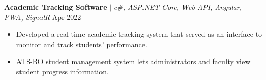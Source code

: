{\textbf{Academic Tracking Software} $|$ \emph{c\#, ASP.NET Core, Web API, Angular, PWA, SignalR}} \hfill Apr 2022 \par
\begin{itemize}
	\item Developed a real-time academic tracking system that served as an interface to monitor and track students' performance.
	\item ATS-BO student management system lets administrators and faculty view student progress information.

\end{itemize}\vspace{0.1cm} \par